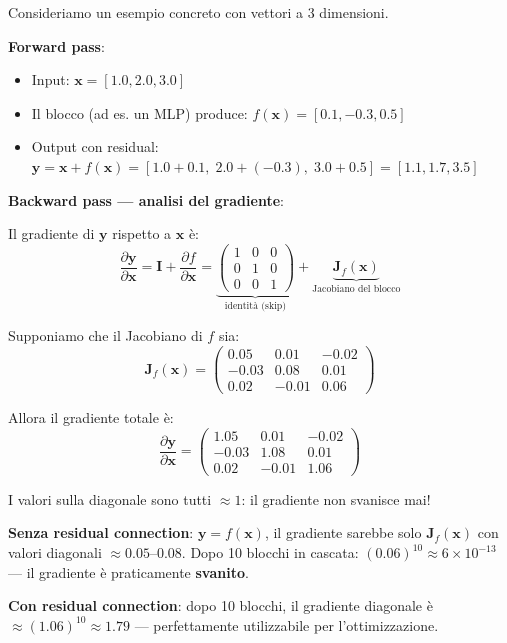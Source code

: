 \documentclass[12pt,a4paper]{article}
\begin{document}
\begin{examplebox}
Consideriamo un esempio concreto con vettori a 3 dimensioni.

\textbf{Forward pass}:
\begin{itemize}
\item Input: $\mathbf{x} = [1.0, 2.0, 3.0]$
\item Il blocco (ad es. un MLP) produce: $f(\mathbf{x}) = [0.1, -0.3, 0.5]$
\item Output con residual: $\mathbf{y} = \mathbf{x} + f(\mathbf{x}) = [1.0 + 0.1,\; 2.0 + (-0.3),\; 3.0 + 0.5] = [1.1, 1.7, 3.5]$
\end{itemize}

\textbf{Backward pass --- analisi del gradiente}:

Il gradiente di $\mathbf{y}$ rispetto a $\mathbf{x}$ \`e:
\[
\frac{\partial \mathbf{y}}{\partial \mathbf{x}} = \mathbf{I} + \frac{\partial f}{\partial \mathbf{x}} = \underbrace{\begin{pmatrix} 1 & 0 & 0 \\ 0 & 1 & 0 \\ 0 & 0 & 1 \end{pmatrix}}_{\text{identit\`a (skip)}} + \underbrace{\mathbf{J}_f(\mathbf{x})}_{\text{Jacobiano del blocco}}
\]

Supponiamo che il Jacobiano di $f$ sia:
\[
\mathbf{J}_f(\mathbf{x}) = \begin{pmatrix} 0.05 & 0.01 & -0.02 \\ -0.03 & 0.08 & 0.01 \\ 0.02 & -0.01 & 0.06 \end{pmatrix}
\]

Allora il gradiente totale \`e:
\[
\frac{\partial \mathbf{y}}{\partial \mathbf{x}} = \begin{pmatrix} 1.05 & 0.01 & -0.02 \\ -0.03 & 1.08 & 0.01 \\ 0.02 & -0.01 & 1.06 \end{pmatrix}
\]

I valori sulla diagonale sono tutti $\approx 1$: il gradiente non svanisce mai!

\textbf{Senza residual connection}: $\mathbf{y} = f(\mathbf{x})$, il gradiente sarebbe solo $\mathbf{J}_f(\mathbf{x})$ con valori diagonali $\approx 0.05\text{--}0.08$. Dopo 10 blocchi in cascata: $(0.06)^{10} \approx 6 \times 10^{-13}$ --- il gradiente \`e praticamente \textbf{svanito}.

\textbf{Con residual connection}: dopo 10 blocchi, il gradiente diagonale \`e $\approx (1.06)^{10} \approx 1.79$ --- perfettamente utilizzabile per l'ottimizzazione.
\end{examplebox}
\end{document}
